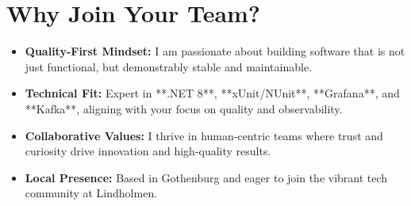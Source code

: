 \documentclass[11pt,a4paper]{article}
\begin{document}
\section*{Why Join Your Team?}
\begin{itemize}[noitemsep]
\item \textbf{Quality-First Mindset:} I am passionate about building software that is not just functional, but demonstrably stable and maintainable.
\item \textbf{Technical Fit:} Expert in **.NET 8**, **xUnit/NUnit**, **Grafana**, and **Kafka**, aligning with your focus on quality and observability.
\item \textbf{Collaborative Values:} I thrive in human-centric teams where trust and curiosity drive innovation and high-quality results.
\item \textbf{Local Presence:} Based in Gothenburg and eager to join the vibrant tech community at Lindholmen.
\end{itemize}
\end{document}
